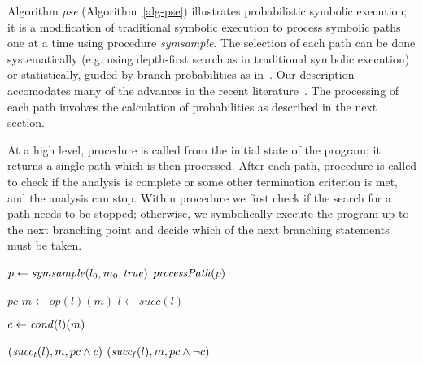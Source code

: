 Algorithm {\em pse} (Algorithm~\ref{alg-pse}) illustrates probabilistic symbolic execution;
it is a modification of traditional symbolic execution to process symbolic paths one at a time using procedure {\em symsample}.
The selection of each path can be done systematically (e.g. using depth-first search as in traditional symbolic execution) or statistically, 
guided by branch probabilities as in~\cite{filieri2014statistical}. 
Our description accomodates many of the advances in the recent literature~\cite{filieri2014statistical,Filieri2013}.
The processing of each path involves the calculation of probabilities as described in
the next section.

At a high level, procedure  is called from the initial state of the program; %
it returns a single path which is then processed.  After each path, procedure  is called to check if the analysis is complete or some other termination criterion is met, 
and the analysis can stop. Within procedure  we first check if the search for a path needs to be stopped; otherwise, we symbolically execute the program up to the next branching 
point and decide which of the next branching statements must be taken. 

\begin{minipage}{0.4\textwidth}
\begin{algorithm}[H]
\caption{$(l,m,pc)$}
\label{alg-pse}
\begin{algorithmic}
 \REPEAT
  \STATE $p \gets \mathit{symsample}(l_0, m_0, \mathit{true})$
  \STATE $\mathit{processPath}(p)$
\end{algorithmic}
\end{algorithm}
\end{minipage}
\begin{minipage}{0.55\textwidth}
\begin{algorithm}[H]
\caption{$(l,m,pc)$}
\label{alg-symsample}
\begin{algorithmic}
 \RETURN $pc$
 \ENDIF
   \STATE $m \gets op(l)(m)$
   \STATE $l \gets succ(l)$
 \ENDWHILE
 
 
 \STATE $c \gets \mathit{cond}(l)(m)$
 
   \RETURN {}$(\mathit{succ_t}(l), m, pc \wedge c)$
 \ELSE
   \RETURN {}$(\mathit{succ_f}(l), m, pc \wedge \neg c)$
 \ENDIF
\end{algorithmic}
\end{algorithm}
\end{minipage}

